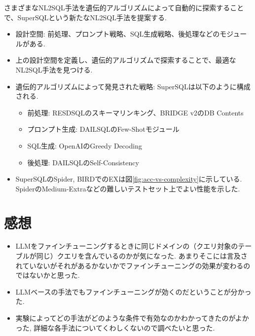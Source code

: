\documentclass[dvipdfmx,uplatex]{jsarticle}
\theoremstyle{remark}
\newenvironment{method}[1]{
    \begin{tcolorbox}[
        colframe=green!50!black,
        colback=green!50!black!10!white,
        colbacktitle=green!50!black!40!white,
        coltitle=black,
        fonttitle=\bfseries,
        title={#1}
    ]
}{
    \end{tcolorbox}
}
\newenvironment{kansou}{
    \begin{tcolorbox}[
        colframe=brown,
        colback=brown!10!white,
        colbacktitle=brown!40!white,
        coltitle=black,fonttitle=\bfseries
    ]
}{
    \end{tcolorbox}
}
\begin{document}
\begin{method}{SuperSQL}
    さまざまなNL2SQL手法を遺伝的アルゴリズムによって自動的に探索することで、SuperSQLという新たなNL2SQL手法を提案する.
    \begin{itemize}
        \item 設計空間: 前処理、プロンプト戦略、SQL生成戦略、後処理などのモジュールがある. 
        \item 上の設計空間を定義し、遺伝的アルゴリズムで探索することで、最適なNL2SQL手法を見つける.
        \item 遺伝的アルゴリズムによって発見された戦略: SuperSQLは以下のように構成される.
        \begin{itemize}
            \item 前処理: RESDSQLのスキーマリンキング、BRIDGE v2のDB Contents
            \item プロンプト生成: DAILSQLのFew-Shotモジュール
            \item SQL生成: OpenAIのGreedy Decoding
            \item 後処理: DAILSQLのSelf-Consistency
        \end{itemize}
        \item SuperSQLのSpider, BIRDでのEXは図\ref{fig:acc-vs-complexity}に示している. SpiderのMedium-Extraなどの難しいテストセット上でよい性能を示した.
    \end{itemize}
\end{method}

\section{感想}
\begin{kansou}
\begin{itemize}
  \item LLMをファインチューニングするときに同じドメインの（クエリ対象のテーブルが同じ）クエリを含んでいるのかが気になった. あまりそこには言及されていないがそれがあるかないかでファインチューニングの効果が変わるのではないかと思った.
  \item LLMベースの手法でもファインチューニングが効くのだということが分かった.
  \item 実験によってどの手法がどのような条件で有効なのかわかってきたのがよかった, 詳細な各手法についてくわしくないので調べたいと思った.
\end{itemize}
\end{kansou}



\end{document}
